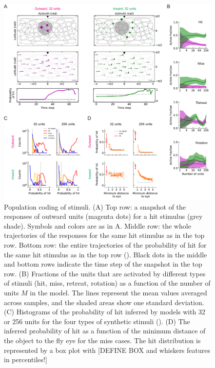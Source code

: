 \documentclass[pdftex,9pt,lineno]{elife}
\begin{document}
\begin{figure}
\begin{fullwidth}
\includegraphics[width=\linewidth]{figures/compare_outward_inward_multiple_units_paper.pdf}
\caption{Population coding of stimuli. (A) Top row: a snapshot of the responses of outward units (magenta dots) for a hit stimulus (grey shade). Symbols and colors are as in A. Middle row: the whole trajectories of the responses for the same hit stimulus as in the top row. Bottom row: the entire trajectories of the probability of hit for the same hit stimulus as in the top row (). Black dots in the middle and bottom rows indicate the time step of the snapshot in the top row. (B) Fractions of the units that are activated by different types of stimuli (hit, miss, retreat, rotation) as a function of the number of units $M$ in the model. The lines represent the mean values averaged across samples, and the shaded areas show one standard deviation. (C) Histograms of the probability of hit inferred by models with 32 or 256 units for the four types of synthetic stimuli (). (D) The inferred probability of hit as a function of the minimum distance of the object to the fly eye for the miss cases. The hit distribution is represented by a box plot with [DEFINE BOX and whiskers features in percentiles!]}
\label{fig:compareMulti}

\end{fullwidth}
\end{figure}
\end{document}
